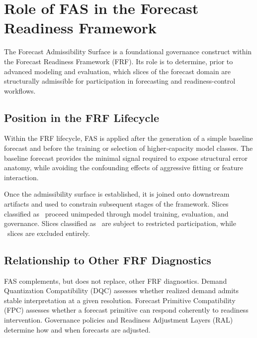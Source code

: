 
\section{Role of FAS in the Forecast Readiness Framework}
\label{sec:fas_role_frf}

The Forecast Admissibility Surface is a foundational governance construct within
the Forecast Readiness Framework (FRF). Its role is to determine, prior to
advanced modeling and evaluation, which slices of the forecast domain are
structurally admissible for participation in forecasting and readiness-control
workflows.

\subsection{Position in the FRF Lifecycle}

Within the FRF lifecycle, FAS is applied after the generation of a simple
baseline forecast and before the training or selection of higher-capacity model
classes. The baseline forecast provides the minimal signal required to expose
structural error anatomy, while avoiding the confounding effects of aggressive
fitting or feature interaction.

Once the admissibility surface is established, it is joined onto downstream
artifacts and used to constrain subsequent stages of the framework. Slices
classified as \Allowed\ proceed unimpeded through model training, evaluation, and
governance. Slices classified as \Conditional\ are subject to restricted
participation, while \Blocked\ slices are excluded entirely.

\subsection{Relationship to Other FRF Diagnostics}

FAS complements, but does not replace, other FRF diagnostics. Demand Quantization
Compatibility (DQC) assesses whether realized demand admits stable interpretation
at a given resolution. Forecast Primitive Compatibility (FPC) assesses whether a
forecast primitive can respond coherently to readiness intervention. Governance
policies and Readiness Adjustment Layers (RAL) determine how and when forecasts
are adjusted.

